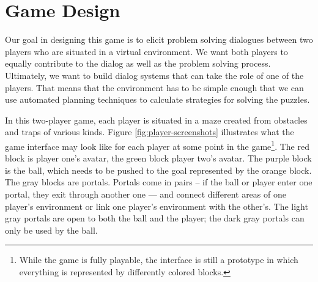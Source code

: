 \section{Game Design}

Our goal in designing this game is to elicit problem solving
dialogues between two players who are situated in a virtual
environment. We want both players to equally contribute to the dialog
as well as the problem solving process.  Ultimately, we want to build
dialog systems that can take the role of one of the players. That
means that the environment has to be simple enough that we can use
automated planning techniques to calculate strategies for solving the
puzzles.

In this two-player game, each player is situated in a maze created
from obstacles and traps of various kinds.  Figure
\ref{fig:player-screenshots} illustrates what the game interface may
look like for each player at some point in the
game\footnote{While the game is fully playable, the interface is still
  a prototype in which everything is represented by differently
  colored blocks.}. The red block is player one's avatar, the green
block player two's avatar. The purple block is the ball, which needs
to be pushed to the goal represented by the orange block. The 
gray blocks are portals. Portals come in pairs -- if the ball or
player enter one portal, they exit through another one --- and connect
different areas of one player's environment or link one player's
environment with the other's. The light gray portals are open to both the
ball and the player; the dark gray portals can only be used by the ball.

